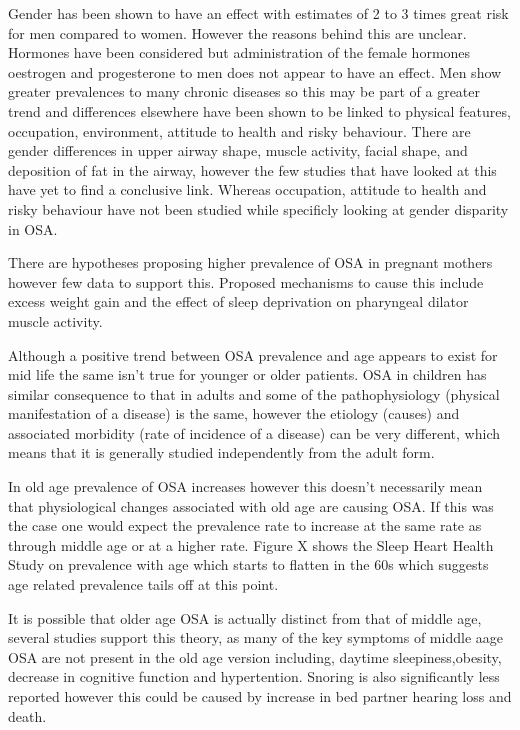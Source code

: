 Gender has been shown to have an effect with estimates of 2 to 3 times great risk for men compared to women. However the reasons behind this are unclear. Hormones have been considered but administration of the female hormones oestrogen and progesterone to men does not appear to have an effect. Men show greater prevalences to many chronic diseases so this may be part of a greater trend and differences elsewhere have been shown to be linked to physical features, occupation, environment, attitude to health and risky behaviour. There are gender differences in upper airway shape, muscle activity, facial shape, and deposition of fat in the airway, however the few studies that have looked at this have yet to find a conclusive link. Whereas occupation, attitude to health and risky behaviour have not been studied while specificly looking at gender disparity in OSA. 

There are hypotheses proposing higher prevalence of OSA in pregnant mothers however few data to support this. Proposed mechanisms to cause this include excess weight gain and the effect of sleep deprivation on pharyngeal dilator muscle activity.

Although a positive trend between OSA prevalence and age appears to exist for mid life the same isn’t true for younger or older patients. OSA in children has similar consequence to that in adults and some of the pathophysiology (physical manifestation of a disease) is the same, however the etiology (causes) and associated morbidity (rate of incidence of a disease) can be very different, which means that it is generally studied independently from the adult form. 

In old age prevalence of OSA increases however this doesn’t necessarily mean that physiological changes associated with old age are causing OSA. If this was the case one would expect the prevalence rate to increase at the same rate as through middle age or at a higher rate. Figure X shows the Sleep Heart Health Study on prevalence with age which starts to flatten in the 60s which suggests age related prevalence tails off at this point. 

It is possible that older age OSA is actually distinct from that of middle age, several studies support this theory, as many of the key symptoms of middle aage OSA are not present in the old age version including, daytime sleepiness,obesity, decrease in cognitive function and hypertention. Snoring is also significantly less reported however this could be caused by increase in bed partner hearing loss and death. 

